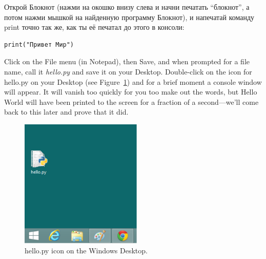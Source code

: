 \begin{WINDOWS}
Открой Блокнот (нажми на окошко внизу слева и начни печатать ``блокнот'', а потом нажми мышкой на найденную программу Блокнот), и напечатай команду print точно так же, как ты её печатал до этого в консоли:

\begin{listing}
\begin{verbatim}
print("Привет Мир")
\end{verbatim}
\end{listing}

Click on the File menu (in Notepad), then Save, and when prompted for a file name, call it \emph{hello.py} and save it on your Desktop. Double-click on the icon for hello.py on your Desktop (see Figure~\ref{fig5}) and for a brief moment a console window will appear.  It will vanish too quickly for you too make out the words, but Hello World will have been printed to the screen for a fraction of a second---we'll come back to this later and prove that it did.\\

\begin{figure}
\begin{center}
\includegraphics[width=58mm]{figure5.eps}
\end{center}
\caption{hello.py icon on the Windows Desktop.}\label{fig5}
\end{figure}
\end{WINDOWS}

